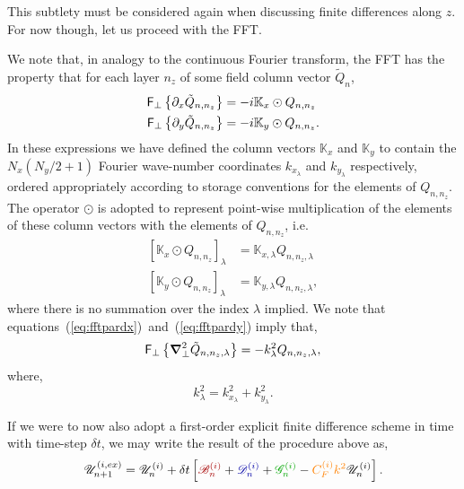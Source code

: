 \documentclass[12pt]{memoir}
\newcommand{\fftperp}{\mathsf{F}_\perp}
\newcommand{\bfield}{\mathscr{B}}
\newcommand{\dfield}{\mathscr{D}}
\newcommand{\gfield}{\mathscr{G}}
\newcommand{\ufield}{\mathscr{U}}
\begin{document}
%
This subtlety must be considered again when discussing finite
differences along $z$. For now though, let us proceed with the
FFT.
%
\par
%
We note that, in analogy to the continuous Fourier transform,
the FFT has the property that for each layer $n_z$ of some field
column vector $\tilde Q_n$,
%
\begin{subequations}
\begin{align}
  \fftperp\left\{\pardx \tilde Q_{n,n_z}\right\} &= -i\mathbb{K}_{x} \odot Q_{n,n_z} \label{eq:fftpardx} \\
  \fftperp\left\{\pardy \tilde Q_{n,n_z}\right\} &= -i\mathbb{K}_{y} \odot Q_{n,n_z} \label{eq:fftpardy}.
\end{align}
\end{subequations}
%
In these expressions we have defined the column vectors
$\mathbb{K}_x$ and $\mathbb{K}_y$ to contain the $N_x(N_y/2+1)$
Fourier wave-number coordinates $k_{x_\lambda}$ and $k_{y_\lambda}$
respectively, ordered appropriately according to storage conventions
for the elements of $Q_{n,n_z}$. The operator $\odot$ is
adopted to represent point-wise multiplication of the elements
of these column vectors with the elements of $Q_{n,n_z}$, i.e.
%
\begin{subequations}
\begin{align}
  \left[\mathbb{K}_{x} \odot Q_{n,n_z}\right]_\lambda &= \mathbb{K}_{x,\lambda} Q_{n,n_z,\lambda} \\
  \left[\mathbb{K}_{y} \odot Q_{n,n_z}\right]_\lambda &= \mathbb{K}_{y,\lambda} Q_{n,n_z,\lambda},
\end{align}
\end{subequations}
%
where there is no summation over the index $\lambda$ implied. We note that
equations~(\ref{eq:fftpardx})~and~(\ref{eq:fftpardy}) imply that,
%
\begin{equation}
  \fftperp\left\{\delperp^2 \tilde Q_{n, n_z,\lambda}\right\} = -k^2_\lambda Q_{n,n_z,\lambda},
  \label{eq:fftdelperp}
\end{equation}
%
where,
\begin{equation}
  k^2_\lambda = k_{x_\lambda}^2 + k_{y_\lambda}^2.
\end{equation}
%
\par
%
If we were to now also adopt a first-order explicit finite difference
scheme in time with time-step $\delta t$, we may write the result
of the procedure above as,
%
\begin{equation}
  \ufield_{n+1}^{(i, ex)} = \ufield^{(i)}_n
                         + \delta t
                         \left[
                         {\color{red!65!black}                    \bfield^{(i)}_n}
                         + {\color{blue!65!black}                 \dfield^{(i)}_n}
                         + {\color{green!65!black}                \gfield^{(i)}_n}
                         - {\color{orange}         C_F^{(i)} k^2} \ufield^{(i)}_n
                         \right].
  \label{eq:exstep}
\end{equation}
\end{document}
